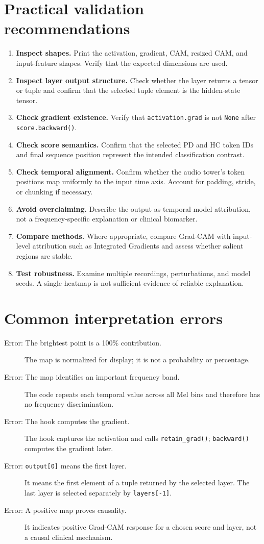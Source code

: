 \documentclass[11pt,a4paper]{article}
\begin{document}
\section{Practical validation recommendations}
\begin{enumerate}
\item \textbf{Inspect shapes.} Print the activation, gradient, CAM, resized CAM, and input-feature shapes. Verify that the expected dimensions are used.
\item \textbf{Inspect layer output structure.} Check whether the layer returns a tensor or tuple and confirm that the selected tuple element is the hidden-state tensor.
\item \textbf{Check gradient existence.} Verify that \texttt{activation.grad} is not \texttt{None} after \texttt{score.backward()}.
\item \textbf{Check score semantics.} Confirm that the selected PD and HC token IDs and final sequence position represent the intended classification contrast.
\item \textbf{Check temporal alignment.} Confirm whether the audio tower's token positions map uniformly to the input time axis. Account for padding, stride, or chunking if necessary.
\item \textbf{Avoid overclaiming.} Describe the output as temporal model attribution, not a frequency-specific explanation or clinical biomarker.
\item \textbf{Compare methods.} Where appropriate, compare Grad-CAM with input-level attribution such as Integrated Gradients and assess whether salient regions are stable.
\item \textbf{Test robustness.} Examine multiple recordings, perturbations, and model seeds. A single heatmap is not sufficient evidence of reliable explanation.
\end{enumerate}

\section{Common interpretation errors}
\begin{description}
\item[Error: The brightest point is a 100\% contribution.] The map is normalized for display; it is not a probability or percentage.
\item[Error: The map identifies an important frequency band.] The code repeats each temporal value across all Mel bins and therefore has no frequency discrimination.
\item[Error: The hook computes the gradient.] The hook captures the activation and calls \texttt{retain\_grad()}; \texttt{backward()} computes the gradient later.
\item[Error: \texttt{output[0]} means the first layer.] It means the first element of a tuple returned by the selected layer. The last layer is selected separately by \texttt{layers[-1]}.
\item[Error: A positive map proves causality.] It indicates positive Grad-CAM response for a chosen score and layer, not a causal clinical mechanism.
\end{description}
\end{document}
